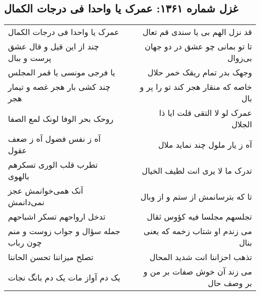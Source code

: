 \begin{center}
\section*{غزل شماره ۱۳۶۱: عمرک یا واحدا فی درجات الکمال}
\label{sec:1361}
\begin{longtable}{l p{0.5cm} r}
عمرک یا واحدا فی درجات الکمال
&&
قد نزل الهم بی یا سندی قم تعال
\\
چند از این قیل و قال عشق پرست و ببال
&&
تا تو بمانی چو عشق در دو جهان بی‌زوال
\\
یا فرجی مونسی یا قمر المجلس
&&
وجهک بدر تمام ریقک خمر حلال
\\
چند کشی بار هجر غصه و تیمار هجر
&&
خاصه که منقار هجر کند تو را پر و بال
\\
روحک بحر الوفا لونک لمع الصفا
&&
عمرک لو لا التقی قلت ایا ذا الجلال
\\
آه ز نفس فضول آه ز ضعف عقول
&&
آه ز یار ملول چند نماید ملال
\\
تطرب قلب الوری تسکرهم بالهوی
&&
تدرک ما لا یری انت لطیف الخیال
\\
آنک همی‌خوانمش عجز نمی‌دانمش
&&
تا که بترسانمش از ستم و از وبال
\\
تدخل ارواحهم تسکر اشباحهم
&&
تجلسهم مجلسا فیه کؤوس ثقال
\\
جمله سؤال و جواب زوست و منم چون رباب
&&
می زندم او شتاب زخمه که یعنی بنال
\\
تصلح میزاننا تحسن الحاننا
&&
تذهب احزاننا انت شدید المحال
\\
یک دم آواز مات یک دم بانگ نجات
&&
می زند آن خوش صفات بر من و بر وصف حال
\\
\end{longtable}
\end{center}
